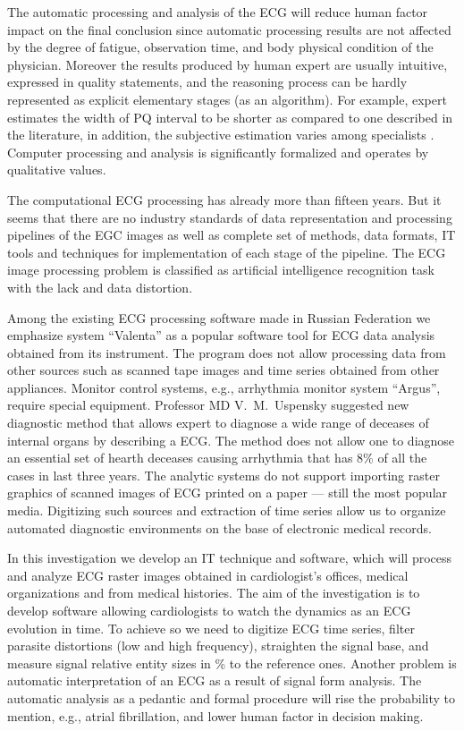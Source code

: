 \documentclass[runningheads]{AIIT}
\begin{document}
The automatic processing and analysis of the ECG will reduce human factor impact on the final conclusion since automatic processing results are not affected by the degree of fatigue, observation time, and body physical condition of the physician.  Moreover the results produced by human expert are usually intuitive, expressed in quality statements, and the reasoning process can be hardly represented as explicit elementary stages (as an algorithm).  For example, expert estimates the width of PQ interval to be shorter as compared to one described in the literature, in addition, the subjective estimation varies among specialists \cite{rangaraj}. Computer processing and analysis is significantly formalized and operates by qualitative values.

The computational ECG processing has already more than fifteen years.  But it seems that there are no industry standards of data representation and processing pipelines of the EGC images as well as complete set of methods, data formats, IT tools and techniques for implementation of each stage of the pipeline.  The ECG image processing problem is classified as artificial intelligence recognition task with the lack and data distortion.

Among the existing ECG processing software made in Russian Federation we emphasize system ``Valenta'' as a popular software tool for ECG data analysis obtained from its instrument.  The program does not allow processing data from other sources such as scanned tape images and time series obtained from other appliances.  Monitor control systems, e.g., arrhythmia monitor system ``Argus'', require special equipment.  Professor MD V.~M.~Uspensky suggested new diagnostic method that allows expert to diagnose a wide range of deceases of internal organs by describing a ECG.  The method does not allow one to diagnose an essential set of hearth deceases causing arrhythmia that has 8\% of all the cases in last three years.  The analytic systems do not support importing raster graphics of scanned images of ECG printed on a paper --- still the most popular media.  Digitizing such sources and extraction of time series allow us to organize automated diagnostic environments on the base of electronic medical records.

In this investigation we develop an IT technique and software, which will process and analyze ECG raster images obtained in cardiologist's offices, medical organizations and from medical histories.  The aim of the investigation is to develop software allowing cardiologists to watch the dynamics as an ECG evolution in time.  To achieve so we need to digitize ECG time series, filter parasite distortions (low and high frequency), straighten the signal base, and measure signal relative entity sizes in \% to the reference ones.  Another problem is automatic interpretation of an ECG as a result of signal form analysis.  The automatic analysis as a pedantic and formal procedure will rise the probability to mention, e.g., atrial fibrillation, and lower human factor in decision making.
\end{document}
